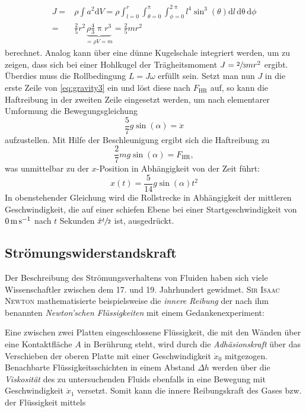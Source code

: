 \begin{equation}
\begin{alignedat}{2}
\label{eq:gravity4}
J=&\rho \int a^2\mathrm{d}V = \rho \int_{l=0}^{r}\int_{\theta=0}^{\uppi}\int_{\phi=0}^{2\uppi}l^4\sin^3(\theta)\mathrm{d}l\,\mathrm{d\theta}\,\mathrm{d}\phi\\
= &\frac{2}{5}r^2\underbrace{\rho\frac{4}{3}\uppi r^3}_{=\rho V=m}=\frac{2}{5}mr^2
\end{alignedat}
\end{equation}
berechnet. Analog kann über eine dünne Kugelschale integriert werden, um zu zeigen, dass sich bei einer Hohlkugel der Trägheitsmoment $J=\sfrac{2}{3}mr^2$ ergibt. Überdies muss die Rollbedingung $L=J\omega$ erfüllt sein. Setzt man nun $J$ in die erste Zeile von \eqref{eq:gravity3} ein und löst diese nach $F_\mathrm{HR}$ auf, so kann die Haftreibung in der zweiten Zeile eingesetzt werden, um nach elementarer Umformung die Bewegungsgleichung
\begin{equation}
\label{eq:gravity5}
\frac{5}{7}g\sin(\alpha)=\ddot{x}
\end{equation}
aufzustellen. Mit Hilfe der Beschleunigung ergibt sich die Haftreibung zu \begin{equation}
\label{eq:gravity6}
\frac{2}{7}mg\sin(\alpha)=F_\mathrm{HR},
\end{equation}
was unmittelbar zu der $x$-Position in Abhängigkeit von der Zeit führt:
\begin{equation}
\label{eq:gravity7}
x(t) = \frac{5}{14}g\sin(\alpha)t^2
\end{equation}
In obenstehender Gleichung wird die Rollstrecke in Abhängigkeit der mittleren Geschwindigkeit, die auf einer schiefen Ebene  bei einer Startgeschwindigkeit von $\SI[fraction-function=\sfrac]{0}{\metre\per\second}$ nach $t$ Sekunden $\dot{x}\sfrac{t}{2}$ ist, ausgedrückt.
\subsection{Strömungswiderstandskraft}
Der Beschreibung des Strömungsverhaltens von Fluiden haben sich viele Wissenschaftler zwischen dem 17. und 19. Jahrhundert gewidmet. \textsc{Sir Isaac Newton} mathematisierte beispielsweise die \textit{innere Reibung} der nach ihm benannten \textit{Newton'schen Flüssigkeiten} mit einem Gedankenexperiment:\par
Eine zwischen zwei Platten eingeschlossene Flüssigkeit, die mit den Wänden über eine Kontaktfläche $A$ in Berührung steht, wird durch die \textit{Adhäsionskraft} über das Verschieben der oberen Platte mit einer Geschwindigkeit $\dot{x}_0$ mitgezogen. Benachbarte Flüssigkeitsschichten in einem Abstand $\Delta h$ werden über die \textit{Viskosität} des zu untersuchenden Fluids ebenfalls in eine Bewegung mit Geschwindigkeit $\dot{x}_1$ versetzt. Somit kann die innere Reibungskraft des Gases bzw. der Flüssigkeit mittels

